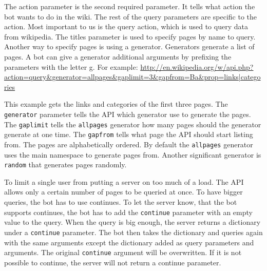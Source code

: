 The action parameter is the second required parameter. It tells what action the bot wants to do in the wiki. The rest of the query parameters are specific to the action. Most important to us is the query action, which is used to query data from wikipedia. The titles parameter is used to specify pages by name to query. Another way to specify pages is using a generator. Generators generate a list of pages. A bot can give a generator additional arguments by prefixing the parameters with the letter g. For example: \url{http://en.wikipedia.org/w/api.php?action=query&generator=allpages&gaplimit=3&gapfrom=Ba&prop=links|categories}

This example gets the links and categories of the first three pages. The \verb;generator; parameter tells the API which generator use to generate the pages. The \verb;gaplimit; tells the \verb;allpages; generator how many pages should the generator generate at one time. The \verb;gapfrom; tells what page the API should start listing from. The pages are alphabetically ordered. By default the \verb;allpages; generator uses the main namespace to generate pages from. Another significant generator is \verb;random; that generates pages randomly.

To limit a single user from putting a server on too much of a load. The API allows only a certain number of pages to be queried at once. To have bigger queries, the bot has to use continues. To let the server know, that the bot supports continues, the bot has to add the \verb;continue; parameter with an empty value to the query. When the query is big enough, the server returns a dictionary under a \verb;continue; parameter. The bot then takes the dictionary and queries again with the same arguments except the dictionary added as query parameters and arguments. The original \verb;continue; argument will be overwritten. If it is not possible to continue, the server will not return a continue parameter.
